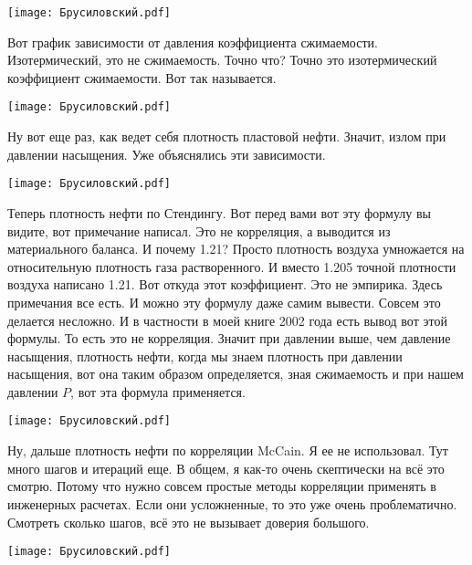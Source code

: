 \documentclass[main.tex]{subfiles}
\begin{document}
\begin{center}
\texttt{[image: Брусиловский.pdf]}
\end{center}

Вот график зависимости от давления коэффициента сжимаемости.
Изотермический, это не сжимаемость.
Точно что?
Точно это изотермический коэффициент сжимаемости.
Вот так называется.

\begin{center}
\texttt{[image: Брусиловский.pdf]}
\end{center}

Ну вот еще раз, как ведет себя плотность пластовой нефти.
Значит, излом при давлении насыщения.
Уже объяснялись эти зависимости.

\begin{center}
\texttt{[image: Брусиловский.pdf]}
\end{center}

Теперь плотность нефти по Стендингу.
Вот перед вами вот эту формулу вы видите, вот примечание написал.
Это не корреляция, а выводится из материального баланса.
И почему 1.21?
Просто плотность воздуха умножается на относительную плотность газа растворенного.
И вместо 1.205 точной плотности воздуха написано 1.21.
Вот откуда этот коэффициент.
Это не эмпирика.
Здесь примечания все есть.
И можно эту формулу даже самим вывести.
Совсем это делается несложно.
И в частности в моей книге 2002 года есть вывод вот этой формулы.
То есть это не корреляция.
Значит при давлении выше, чем давление насыщения, плотность нефти, когда мы знаем плотность при давлении насыщения, вот она таким образом определяется, зная сжимаемость и при нашем давлении $P$, вот эта формула применяется.

\begin{center}
\texttt{[image: Брусиловский.pdf]}
\end{center}

Ну, дальше плотность нефти по корреляции McCain.
Я ее не использовал.
Тут много шагов и итераций еще.
В общем, я как-то очень скептически на всё это смотрю.
Потому что нужно совсем простые методы корреляции применять в инженерных расчетах.
Если они усложненные, то это уже очень проблематично.
Смотреть сколько шагов, всё это не вызывает доверия большого.

\begin{center}
\texttt{[image: Брусиловский.pdf]}
\end{center}
\end{document}
